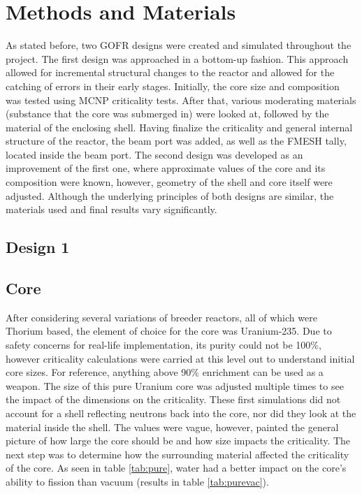 \label{sec:methods}
\section{Methods and Materials}

As stated before, two GOFR designs were created and simulated throughout the project. The first design was approached in a bottom-up fashion. This approach allowed for incremental structural changes to the reactor and allowed for the catching of errors in their early stages. Initially, the core size and composition was tested using MCNP criticality tests. After that, various moderating materials (substance that the core was submerged in) were looked at, followed by the material of the enclosing shell. Having finalize the criticality and general internal structure of the reactor, the beam port was added, as well as the FMESH tally, located inside the beam port. The second design was developed as an improvement of the first one, where approximate values of the core and its composition were known, however, geometry of the shell and core itself were adjusted. Although the underlying principles of both designs are similar, the materials used and final results vary significantly.

\subsection{Design 1}

\subsection{Core}

After considering several variations of breeder reactors, all of which were Thorium based, the element of choice for the core was Uranium-235. Due to safety concerns for real-life implementation, its purity could not be 100\%, however criticality calculations were carried at this level out to understand initial core sizes. For reference, anything above 90\% enrichment can be used as a weapon. The size of this pure Uranium core was adjusted multiple times to see the impact of the dimensions on the criticality. These first simulations did not account for a shell reflecting neutrons back into the core, nor did they look at the material inside the shell. The values were vague, however, painted the general picture of how large the core should be and how size impacts the criticality. The next step was to determine how the surrounding material affected the criticality of the core. As seen in table \ref{tab:pure},
water had a better impact on the core's ability to fission than vacuum (results in table \ref{tab:purevac}).

